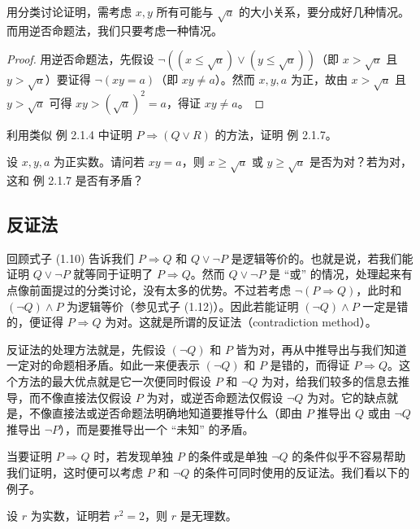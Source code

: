 用分类讨论证明，需考虑 $x, y$ 所有可能与 $\sqrt{a}$ 的大小关系，要分成好几种情况。而用逆否命题法，我们只要考虑一种情况。

\begin{proof}
用逆否命题法，先假设 $\neg ((x \le \sqrt{a}) \lor (y \le \sqrt{a}))$（即 $x > \sqrt{a}$ 且 $y > \sqrt{a}$）要证得 $\neg (xy = a)$（即 $xy \neq a$）。然而 $x, y, a$ 为正，故由 $x > \sqrt{a}$ 且 $y > \sqrt{a}$ 可得 $xy > (\sqrt{a})^{2} = a$，得证 $xy \neq a$。
\end{proof}

\begin{question}
利用类似 例 2.1.4 中证明 $P \Rightarrow (Q \lor R)$ 的方法，证明 例 2.1.7。
\end{question}

\begin{question}
设 $x, y, a$ 为正实数。请问若 $xy = a$，则 $x \ge \sqrt{a}$ 或 $y \ge \sqrt{a}$ 是否为对？若为对，这和 例 2.1.7 是否有矛盾？
\end{question}

\subsection{反证法}

回顾式子 (1.10) 告诉我们 $P \Rightarrow Q$ 和 $Q \lor \neg P$ 是逻辑等价的。也就是说，若我们能证明 $Q \lor \neg P$ 就等同于证明了 $P \Rightarrow Q$。然而 $Q \lor \neg P$ 是 “或” 的情况，处理起来有点像前面提过的分类讨论，没有太多的优势。不过若考虑 $\neg (P \Rightarrow Q)$，此时和 $(\neg Q) \land P$ 为逻辑等价（参见式子 (1.12)）。因此若能证明 $(\neg Q) \land P$ 一定是错的，便证得 $P \Rightarrow Q$ 为对。这就是所谓的反证法（contradiction method）。

反证法的处理方法就是，先假设 $(\neg Q)$ 和 $P$ 皆为对，再从中推导出与我们知道一定对的命题相矛盾。如此一来便表示 $(\neg Q)$ 和 $P$ 是错的，而得证 $P \Rightarrow Q$。这个方法的最大优点就是它一次便同时假设 $P$ 和 $\neg Q$ 为对，给我们较多的信息去推导，而不像直接法仅假设 $P$ 为对，或逆否命题法仅假设 $\neg Q$ 为对。它的缺点就是，不像直接法或逆否命题法明确地知道要推导什么（即由 $P$ 推导出 $Q$ 或由 $\neg Q$ 推导出 $\neg P$），而是要推导出一个 “未知” 的矛盾。

当要证明 $P \Rightarrow Q$ 时，若发现单独 $P$ 的条件或是单独 $\neg Q$ 的条件似乎不容易帮助我们证明，这时便可以考虑 $P$ 和 $\neg Q$ 的条件可同时使用的反证法。我们看以下的例子。

\begin{example}
设 $r$ 为实数，证明若 $r^{2} = 2$，则 $r$ 是无理数。
\end{example}

